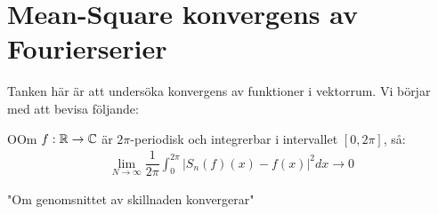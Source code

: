 \section{Mean-Square konvergens av Fourierserier}\par
\noindent Tanken här är att undersöka konvergens av funktioner i vektorrum. Vi börjar med att bevisa följande:
\par\bigskip
\begin{theo}
  OOm $f:\mathbb{R}\to\mathbb{C}$ är $2\pi$-periodisk och integrerbar i intervallet $[0,2\pi]$, så:
  \begin{equation*}
    \begin{gathered}
      \lim_{N\to\infty}\dfrac{1}{2\pi}\int_{0}^{2\pi}\left|S_n(f)(x)-f(x)\right|^2dx \to0
    \end{gathered}
  \end{equation*}\par
  \noindent "Om genomsnittet av skillnaden konvergerar"
\end{theo}
